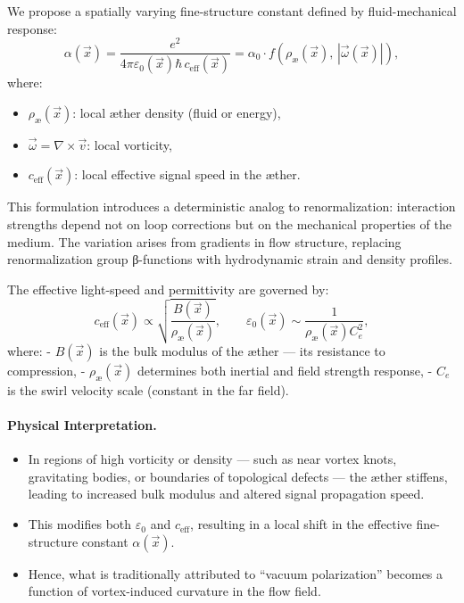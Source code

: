 We propose a spatially varying fine-structure constant defined by fluid-mechanical response:
\begin{equation}
\alpha(\vec{x}) = \frac{e^2}{4\pi \varepsilon_0(\vec{x}) \hbar \, c_{\text{eff}}(\vec{x})} = \alpha_0 \cdot f\left( \rho_\text{\ae}(\vec{x}), \, |\vec{\omega}(\vec{x})| \right),
\end{equation}
where:
\begin{itemize}
    \item \( \rho_\text{\ae}(\vec{x}) \): local æther density (fluid or energy),
    \item \( \vec{\omega} = \nabla \times \vec{v} \): local vorticity,
    \item \( c_{\text{eff}}(\vec{x}) \): local effective signal speed in the æther.
\end{itemize}

This formulation introduces a deterministic analog to renormalization: interaction strengths depend not on loop corrections but on the mechanical properties of the medium. The variation arises from gradients in flow structure, replacing renormalization group β-functions with hydrodynamic strain and density profiles.

\vspace{0.5em}

The effective light-speed and permittivity are governed by:
\begin{equation}
    c_{\text{eff}}(\vec{x}) \propto \sqrt{ \frac{B(\vec{x})}{\rho_\text{\ae}(\vec{x})} }, \qquad
    \varepsilon_0(\vec{x}) \sim \frac{1}{\rho_\text{\ae}(\vec{x}) C_e^2},
\end{equation}
where:
- \( B(\vec{x}) \) is the bulk modulus of the æther — its resistance to compression,
- \( \rho_\text{\ae}(\vec{x}) \) determines both inertial and field strength response,
- \( C_e \) is the swirl velocity scale (constant in the far field).

\vspace{0.5em}

\paragraph{Physical Interpretation.}
\begin{itemize}
    \item In regions of high vorticity or density — such as near vortex knots, gravitating bodies, or boundaries of topological defects — the æther stiffens, leading to increased bulk modulus and altered signal propagation speed.
    \item This modifies both \( \varepsilon_0 \) and \( c_{\text{eff}} \), resulting in a local shift in the effective fine-structure constant \( \alpha(\vec{x}) \).
    \item Hence, what is traditionally attributed to “vacuum polarization” becomes a function of vortex-induced curvature in the flow field.
\end{itemize}


